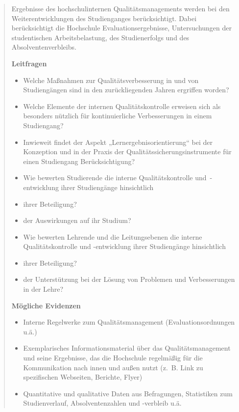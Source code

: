 \begin{quote}
Ergebnisse des hochschulinternen Qualitätsmanagements werden bei den
Weiterentwicklungen des Studienganges berücksichtigt. Dabei
berücksichtigt die Hochschule Evaluationsergebnisse, Untersuchungen der
studentischen Arbeitsbelastung, des Studienerfolgs und des
Absolventenverbleibs.

\textbf{Leitfragen}

\begin{itemize}
\item
  Welche Maßnahmen zur Qualitätsverbesserung in und von Studiengängen
  sind in den zurückliegenden Jahren ergriffen worden?
\item
  Welche Elemente der internen Qualitätskontrolle erweisen sich als
  besonders nützlich für kontinuierliche Verbesserungen in einem
  Studiengang?
\item
  Inwieweit findet der Aspekt „Lernergebnisorientierung`` bei der
  Konzeption und in der Praxis der Qualitätssicherungsinstrumente für
  einen Studiengang Berücksichtigung?
\item
  Wie bewerten Studierende die interne Qualitätskontrolle
  und~-entwicklung ihrer Studiengänge hinsichtlich
\item
  ihrer Beteiligung?
\item
  der Auswirkungen auf ihr Studium?
\item
  Wie bewerten Lehrende und die Leitungsebenen die interne
  Qualitätskontrolle und -entwicklung ihrer Studiengänge hinsichtlich
\item
  ihrer Beteiligung?
\item
  der Unterstützung bei der Lösung von Problemen und Verbesserungen in
  der Lehre?
\end{itemize}

\textbf{Mögliche Evidenzen}

\begin{itemize}
\item
  Interne Regelwerke zum Qualitätsmanagement (Evaluationsordnungen u.ä.)
\item
  Exemplarisches Informationsmaterial über das Qualitätsmanagement und
  seine Ergebnisse, das die Hochschule regelmäßig für die Kommunikation
  nach innen und außen nutzt (z.~B. Link zu spezifischen Webseiten,
  Berichte, Flyer)
\item
  Quantitative und qualitative Daten aus Befragungen, Statistiken zum
  Studienverlauf, Absolventenzahlen und -verbleib u.ä.
\end{itemize}
\end{quote}

